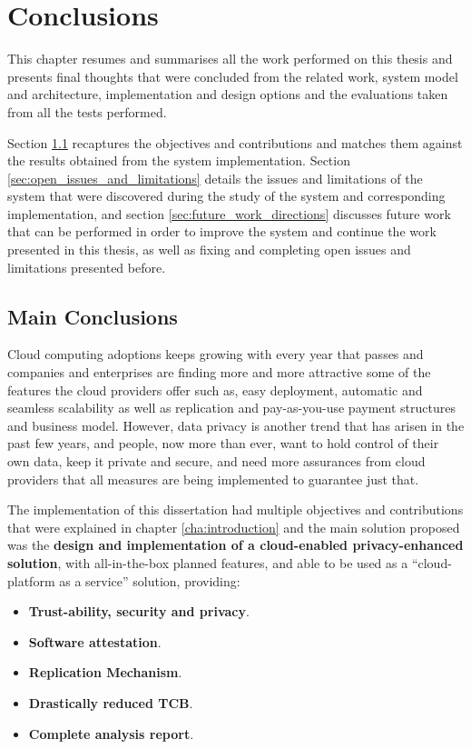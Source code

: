 
\chapter{Conclusions}
\label{cha:conclusions}

This chapter resumes and summarises all the work performed on this thesis and presents final thoughts that were concluded from the related work, system model and architecture, implementation and design options and the evaluations taken from all the tests performed.

Section \ref{sec:main_conclusion} recaptures the objectives and contributions and matches them against the results obtained from the system implementation. Section \ref{sec:open_issues_and_limitations} details the issues and limitations of the system that were discovered during the study of the system and corresponding implementation, and section \ref{sec:future_work_directions} discusses future work that can be performed in order to improve the system and continue the work presented in this thesis, as well as fixing and completing open issues and limitations presented before.

\section{Main Conclusions}
\label{sec:main_conclusion}

Cloud computing adoptions keeps growing with every year that passes and companies and enterprises are finding more and more attractive some of the features the cloud providers offer such as, easy deployment, automatic and seamless scalability as well as replication and pay-as-you-use payment structures and business model. However, data privacy is another trend that has arisen in the past few years, and people, now more than ever, want to hold control of their own data, keep it private and secure, and need more assurances from cloud providers that all measures are being implemented to guarantee just that.

The implementation of this dissertation had multiple objectives and contributions that were explained in chapter \ref{cha:introduction} and the main solution proposed was the \textbf{design and implementation of a cloud-enabled privacy-enhanced solution}, with all-in-the-box planned features, and able to be used as a “cloud-platform as a service” solution, providing:

\begin{itemize}
	\item \textbf{Trust-ability, security and privacy}.
	\item \textbf{Software attestation}.
 	\item \textbf{Replication Mechanism}.
  	\item \textbf{Drastically reduced TCB}.
  	\item \textbf{Complete analysis report}. 
\end{itemize}

